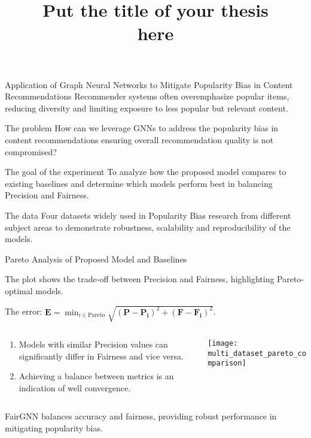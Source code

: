 \documentclass[10pt,pdf,hyperref={unicode}]{beamer}
\title{ Put the title of your thesis \\ here}
\begin{document}
\setcounter{page}{2}%
\begin{frame}{Application of Graph Neural Networks to Mitigate Popularity Bias in Content Recommendations}
    Recommender systems often overemphasize popular items, reducing diversity and limiting exposure to less popular but relevant content.

    \begin{block}{The problem}
        How can we leverage GNNs to address the popularity bias in content recommendations ensuring overall recommendation quality
        is not compromised?
    \end{block}

    \begin{block}{The goal of the experiment}
        To analyze how the proposed model compares to existing baselines and determine which models perform best in balancing Precision and Fairness.
    \end{block}

    \begin{block}{The data}
        Four datasets widely used in Popularity Bias research from different subject areas to demonstrate robustness, scalability and reproducibility
        of the models.
    \end{block}
\end{frame}
\begin{frame}{Pareto Analysis of Proposed Model and Baselines}

The plot shows the trade-off between Precision and Fairness, highlighting Pareto-optimal models. 

The error: $\scriptstyle{\mathbf{E} = \min_{i \in \text{Pareto}} \sqrt{(\mathbf{P} - \mathbf{P_i})^2 + (\mathbf{F} - \mathbf{F_i})^2}}$.

\begin{columns}
    \begin{column}{0.3\textwidth}
        \begin{enumerate}[1]
            \item Models with similar Precision values can significantly differ in Fairness and vice versa.
            \item Achieving a balance between metrics is an indication of well convergence.
        \end{enumerate}
    \end{column}
    \begin{column}{0.8\textwidth}
	    \texttt{[image: multi\_dataset\_pareto\_comparison]}      
    \end{column}
\end{columns}

\bigskip

FairGNN balances accuracy and fairness, providing robust performance in mitigating popularity bias.
\end{frame}
\end{document}
